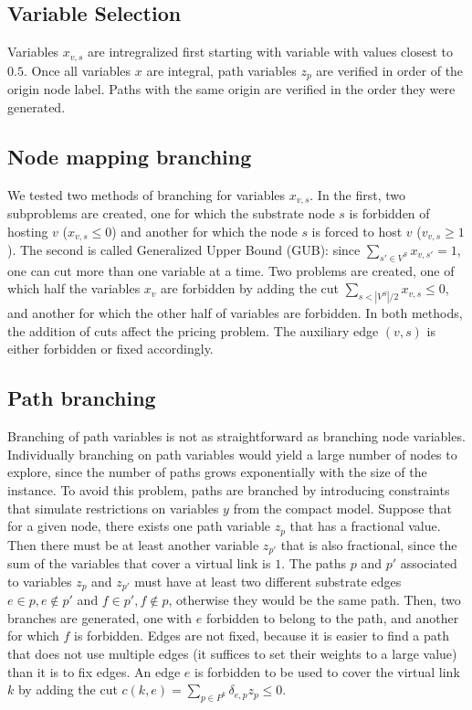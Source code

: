 \subsection{Variable Selection}
\label{sec:varsel}
Variables $x_{v,s}$ are intregralized first starting with variable with values closest to $0.5$.
Once all variables $x$ are integral, path variables $z_{p}$ are verified in order of the origin node label.
Paths with the same origin are verified in the order they were generated. 

\subsection{Node mapping branching}
We tested two methods of branching for variables $x_{v,s}$.
In the first, two subproblems are created, one for which the substrate node $s$ is forbidden of hosting $v$ ($x_{v,s} \leq 0$) and another for which the node $s$ is forced to host $v$ ($v_{v,s} \geq 1$).
The second is called Generalized Upper Bound (GUB):
since $\sum\limits_{s' \in V^S} x_{v,s'} = 1$, one can cut more than one variable at a time. Two problems are created, one of which half the variables $x_{v}$ are forbidden by adding the cut $\sum\limits_{s < |V^S| / 2} x_{v,s} \leq 0$, and another for which the other half of variables are forbidden.
In both methods, the addition of cuts affect the pricing problem.
The auxiliary edge $(v,s)$ is either forbidden or fixed accordingly.

\subsection{Path branching}
Branching of path variables is not as straightforward as branching node variables. 
Individually branching on path variables would yield a large number of nodes to explore, since the number of paths grows exponentially with the size of the instance. 
To avoid this problem, paths are branched by introducing constraints that simulate restrictions on variables $y$ from the compact model. 
Suppose that for a given node, there exists one path variable $z_{p}$ that has a fractional value. Then there must be at least another variable $z_{p'}$ that is also fractional, since the sum of the variables that cover a virtual link is $1$. 
The paths $p$ and $p'$ associated to variables $z_{p}$ and $z_{p'}$ must have at least two different substrate edges $e \in p, e \notin p'$ and $f \in p', f \notin p$, otherwise they would be the same path. Then, two branches are generated, one with $e$ forbidden to belong to the path, and another for which $f$ is forbidden. Edges are not fixed, because it is easier to find a path that does not use multiple edges (it suffices to set their weights to a large value) than it is to fix edges. An edge $e$ is forbidden to be used to cover the virtual link $k$ by adding the cut $c(k,e) = \sum\limits_{p \in P^k} \delta_{e,p} z_p \leq 0$.

